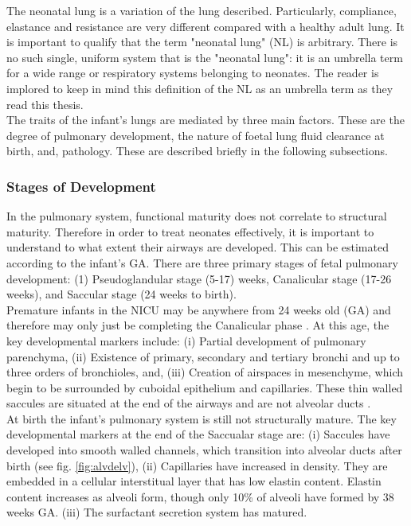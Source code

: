 \documentclass[12pt, openany, oneside]{book}
\begin{document}
The neonatal lung is a variation of the lung described. Particularly, compliance, elastance and resistance are very different compared with a healthy adult lung. It is important to qualify that the term "neonatal lung" (NL) is arbitrary. There is no such single, uniform system that is the "neonatal lung": it is an umbrella term for a wide range or respiratory systems belonging to neonates. The reader is implored to keep in mind this definition of the NL as an umbrella term as they read this thesis. \\

The traits of the infant's lungs are mediated by three main factors. These are the degree of pulmonary development, the nature of foetal lung fluid clearance at birth, and, pathology. These are described briefly in the following subsections.

\subsubsection{Stages of Development}
In the pulmonary system, functional maturity does not correlate to structural maturity. Therefore in order to treat neonates effectively, it is important to understand to what extent their airways are developed. This can be estimated according to the infant's GA. There are three primary stages of fetal pulmonary development: (1) Pseudoglandular stage (5-17) weeks, Canalicular stage (17-26 weeks), and Saccular stage (24 weeks to birth). \\

Premature infants in the NICU may be anywhere from 24 weeks old (GA) and therefore may only just be completing the Canalicular phase \cite{burri1984fetal}. At this age, the key developmental markers include: (i) Partial development of pulmonary parenchyma, (ii) Existence of primary, secondary and tertiary bronchi and up to three orders of bronchioles, and, (iii) Creation of airspaces in mesenchyme, which begin to be surrounded by cuboidal epithelium and capillaries. These thin walled saccules are situated at the end of the airways and are not alveolar ducts \cite{burri1984fetal}.\\

At birth the infant's pulmonary system is still not structurally mature. The key developmental markers at the end of the Saccualar stage are: (i) Saccules have developed into smooth walled channels, which transition into alveolar ducts after birth (see fig. \ref{fig:alvdelv}), (ii) Capillaries have increased in density. They are embedded in a cellular interstitual layer that has low elastin content. Elastin content increases as alveoli form, though only 10{\%} of alveoli have formed by 38 weeks GA. (iii) The surfactant secretion system has matured. \\
\end{document}
